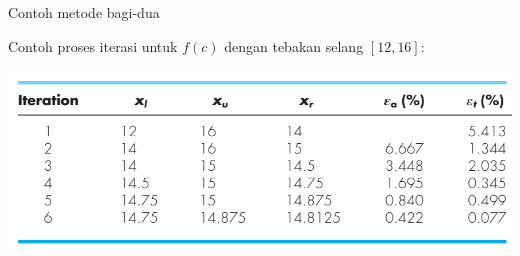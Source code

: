 \begin{frame}{Contoh metode bagi-dua}

Contoh proses iterasi untuk $f(c)$ dengan tebakan selang $[12,16]$:

{\centering
\includegraphics[height=0.5\textheight]{../chapra_7th/Chapra_Table_Example_5_4.png}
\par}

\end{frame}


